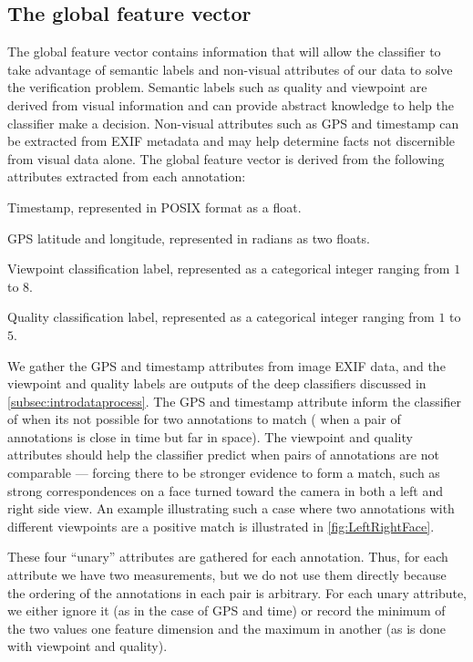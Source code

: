 \subsection{The global feature vector}

The global feature vector contains information that will allow the classifier to take advantage of semantic
  labels and non-visual attributes of our data to solve the verification problem.
Semantic labels such as quality and viewpoint are derived from visual information and can provide abstract
  knowledge to help the classifier make a decision.
Non-visual attributes such as GPS and timestamp can be extracted from EXIF metadata and may help determine facts
  not discernible from visual data alone.
The global feature vector is derived from the following attributes extracted from each annotation:
\begin{enumln}

    \item Timestamp, represented in POSIX format as a float.

    \item GPS latitude and longitude, represented in radians as two floats. 

    \item Viewpoint classification label, represented as a categorical integer ranging from $1$ to $8$.

    \item Quality classification label, represented as a categorical integer ranging from $1$ to $5$.
\end{enumln}
We gather the GPS and timestamp attributes from image EXIF data, and the viewpoint and quality labels are outputs
  of the deep classifiers discussed in \cref{subsec:introdataprocess}.
The GPS and timestamp attribute inform the classifier of when its not possible for two annotations to match
  (\eg{} when a pair of annotations is close in time but far in space).
The viewpoint and quality attributes should help the classifier predict when pairs of annotations are not
  comparable --- forcing there to be stronger evidence to form a match, such as strong correspondences on a face
  turned toward the camera in both a left and right side view.
An example illustrating such a case where two annotations with different viewpoints are a positive match is
  illustrated in \cref{fig:LeftRightFace}.

\LeftRightFace{}

These four ``unary'' attributes are gathered for each annotation.
Thus, for each attribute we have two measurements, but we do not use them directly because the ordering of the
  annotations in each pair is arbitrary.
For each unary attribute, we either ignore it (as in the case of GPS and time) or record the minimum of the two
  values one feature dimension and the maximum in another (as is done with viewpoint and quality).

